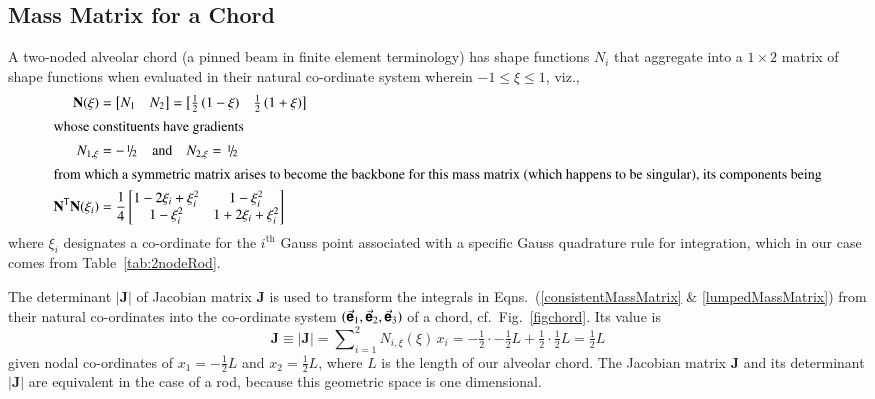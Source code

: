 \subsection{Mass Matrix for a Chord}

A two-noded alveolar chord (a pinned beam in finite element terminology) has shape functions $N_i$ that aggregate into a $1 \! \times \! 2$ matrix of shape functions when evaluated in their natural co-ordinate system wherein $-1 \leq \xi \leq 1$, viz.,
\begin{subequations}
    \begin{align}
    \mathbf{N} (\xi) & = \bigl[ \begin{matrix} N_1 & N_2 \end{matrix} \bigr] =
    \bigl[ \begin{matrix}
    \frac{1}{2} \, (1 - \xi) &  \frac{1}{2} \, (1 + \xi)
    \end{matrix} \bigr] \\
    \intertext{whose constituents have gradients}
    N_{1,\xi} & = -\textfrac{1}{2} 
    \quad \text{and} \quad
    N_{2,\xi} = \textfrac{1}{2} \\
    \intertext{from which a symmetric matrix arises to become the backbone for this mass matrix (which happens to be singular), its components being}
    \mathbf{N}^{\mathsf{T}} \mathbf{N} (\xi_i) & = \frac{1}{4} \begin{bmatrix}
    1 - 2\xi_i + \xi_i^2 & 1 - \xi_i^2 \\
    1 - \xi_i^2 & 1 + 2 \xi_i + \xi_i^2    
    \end{bmatrix} 
    \end{align}
\end{subequations}
where $\xi_i$ designates a co-ordinate for the $i^{\mathrm{th}}$ Gauss point associated with a specific Gauss quadrature rule for integration, which in our case comes from Table~\ref{tab:2nodeRod}.

The determinant $| \mathbf{J} |$ of Jacobian matrix $\mathbf{J}$ is used to transform the integrals in Eqns.~(\ref{consistentMassMatrix} \& \ref{lumpedMassMatrix}) from their natural co-ordinates into the co-ordinate system $( \vec{\boldsymbol{\mathsf{e}}}_1 , \vec{\boldsymbol{\mathsf{e}}}_2 , \vec{\boldsymbol{\mathsf{e}}}_3 )$ of a chord, cf.\ Fig.~\ref{figchord}.  Its value is
\begin{equation}
\mathbf{J} \equiv | \mathbf{J} | = \sum\nolimits_{i=1}^2 N_{i,\xi} (\xi) \, x_i = 
-\tfrac{1}{2} \cdot -\tfrac{1}{2} L + \tfrac{1}{2} \cdot \tfrac{1}{2} L = 
\tfrac{1}{2} L
\label{detJac1D}
\end{equation}
given nodal co-ordinates of $x_1 = -\tfrac{1}{2} L$ and $x_2 = \tfrac{1}{2} L$, where $L$ is the length of our alveolar chord.  The Jacobian matrix $\mathbf{J}$ and its determinant $| \mathbf{J} |$ are equivalent in the case of a rod, because this geometric space is one dimensional. 

